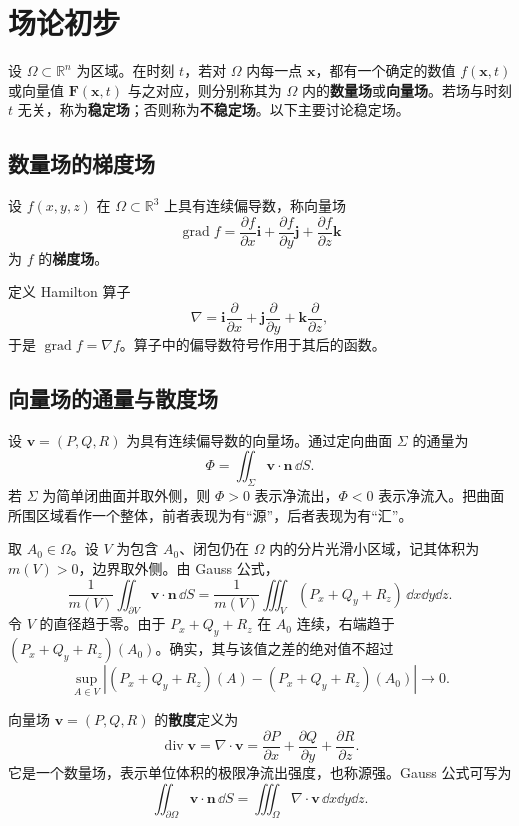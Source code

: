 \section{场论初步}

\begin{definition}
设 $\Omega\subset\mathbb R^n$ 为区域。在时刻 $t$，若对 $\Omega$ 内每一点 $\boldsymbol x$，都有一个确定的数值 $f(\boldsymbol x,t)$ 或向量值 $\boldsymbol F(\boldsymbol x,t)$ 与之对应，则分别称其为 $\Omega$ 内的\textbf{数量场}或\textbf{向量场}。若场与时刻 $t$ 无关，称为\textbf{稳定场}；否则称为\textbf{不稳定场}。以下主要讨论稳定场。
\end{definition}

\subsection*{数量场的梯度场}
\begin{definition}
设 $f(x,y,z)$ 在 $\Omega\subset\mathbb R^3$ 上具有连续偏导数，称向量场
\[
\operatorname{grad}f=\frac{\partial f}{\partial x}\boldsymbol i
+\frac{\partial f}{\partial y}\boldsymbol j
+\frac{\partial f}{\partial z}\boldsymbol k
\]
为 $f$ 的\textbf{梯度场}。
\end{definition}
定义 Hamilton 算子
\[
\nabla=\boldsymbol i\frac{\partial}{\partial x}
+\boldsymbol j\frac{\partial}{\partial y}
+\boldsymbol k\frac{\partial}{\partial z},
\]
于是 $\operatorname{grad}f=\nabla f$。算子中的偏导数符号作用于其后的函数。

\subsection*{向量场的通量与散度场}
设 $\boldsymbol v=(P,Q,R)$ 为具有连续偏导数的向量场。通过定向曲面 $\Sigma$ 的通量为
\[
\Phi=\displaystyle\iint_\Sigma\boldsymbol v\cdot\boldsymbol n\,\dd S.
\]
若 $\Sigma$ 为简单闭曲面并取外侧，则 $\Phi>0$ 表示净流出，$\Phi<0$ 表示净流入。把曲面所围区域看作一个整体，前者表现为有“源”，后者表现为有“汇”。

取 $A_0\in\Omega$。设 $V$ 为包含 $A_0$、闭包仍在 $\Omega$ 内的分片光滑小区域，记其体积为 $m(V)>0$，边界取外侧。由 Gauss 公式，
\[
\frac1{m(V)}\displaystyle\iint_{\partial V}\boldsymbol v\cdot\boldsymbol n\,\dd S
=\frac1{m(V)}\iiint_V(P_x+Q_y+R_z)\,\dd x\dd y\dd z.
\]
令 $V$ 的直径趋于零。由于 $P_x+Q_y+R_z$ 在 $A_0$ 连续，右端趋于 $(P_x+Q_y+R_z)(A_0)$。确实，其与该值之差的绝对值不超过
\[
\sup_{A\in V}|(P_x+Q_y+R_z)(A)-(P_x+Q_y+R_z)(A_0)|\longrightarrow0.
\]
\begin{definition}
向量场 $\boldsymbol v=(P,Q,R)$ 的\textbf{散度}定义为
\[
\operatorname{div}\boldsymbol v=\nabla\cdot\boldsymbol v
=\frac{\partial P}{\partial x}+\frac{\partial Q}{\partial y}+\frac{\partial R}{\partial z}.
\]
它是一个数量场，表示单位体积的极限净流出强度，也称源强。Gauss 公式可写为
\[
\displaystyle\iint_{\partial\Omega}\boldsymbol v\cdot\boldsymbol n\,\dd S
=\iiint_\Omega\nabla\cdot\boldsymbol v\,\dd x\dd y\dd z.
\]
\end{definition}

